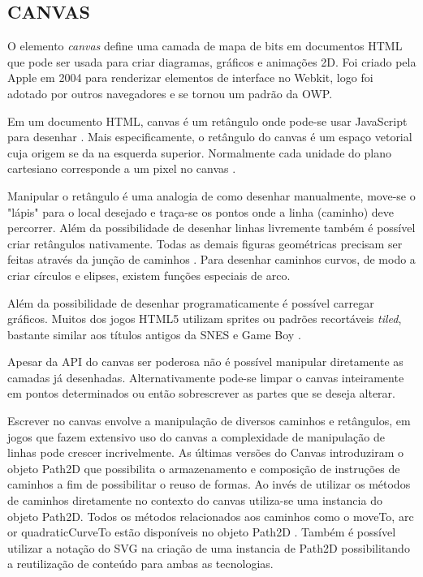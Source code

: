 \subsection{CANVAS}
O elemento \textit{canvas} define uma camada de mapa de bits em documentos
HTML que pode ser usada para criar diagramas, gráficos e animações
2D. Foi criado pela Apple em 2004 para renderizar elementos de interface
no Webkit, logo foi adotado por outros navegadores e se tornou um
padrão da OWP.

Em um documento HTML, canvas é um retângulo onde pode-se usar
JavaScript para desenhar \autocite[pp. 113]{diveIntohtml}. 
Mais especificamente, o retângulo do canvas é um espaço vetorial 
cuja origem se da na esquerda superior. Normalmente cada unidade do plano cartesiano corresponde a um pixel no canvas \autocite{mdnCanvas}.

Manipular o retângulo é uma analogia de como desenhar manualmente,
move-se o "lápis" para o local desejado e traça-se os pontos onde
a linha (caminho) deve percorrer. Além da possibilidade de desenhar linhas
livremente também é possível criar retângulos nativamente. Todas as demais figuras geométricas precisam ser feitas através da junção de caminhos \autocite{mdnCanvas}. Para desenhar caminhos curvos, de modo a criar círculos e elipses, existem funções especiais de arco.

Além da possibilidade de desenhar programaticamente é possível
carregar gráficos. Muitos dos jogos HTML5 utilizam sprites ou
padrões recortáveis \textit{tiled}, bastante similar aos títulos antigos da SNES e Game Boy \autocite{buildingHtml5Game}.

Apesar da API do canvas ser poderosa não é possível manipular diretamente as camadas já desenhadas. Alternativamente pode-se limpar o canvas inteiramente em pontos determinados ou então sobrescrever as partes que se deseja alterar.

Escrever no canvas envolve a manipulação de  diversos caminhos e retângulos, em jogos que fazem extensivo uso do canvas a complexidade de manipulação de linhas pode crescer incrivelmente. As últimas versões do Canvas introduziram o objeto Path2D que possibilita o armazenamento  e composição de instruções de caminhos a fim de possibilitar o reuso de formas. Ao invés de utilizar os métodos de caminhos diretamente no contexto do canvas utiliza-se uma instancia do objeto Path2D. Todos os métodos relacionados aos caminhos como o moveTo, arc or quadraticCurveTo estão disponíveis no objeto Path2D \autocite{mdnCanvas}. Também é possível utilizar a notação do SVG na criação de uma instancia de Path2D possibilitando a reutilização  de conteúdo para ambas as tecnologias.

